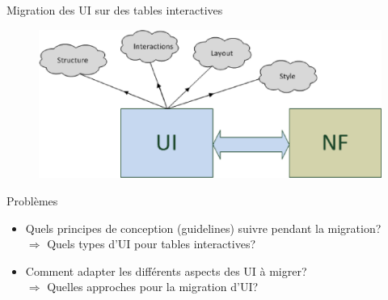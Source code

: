 \documentclass[11pt]{beamer}
\begin{document}
\begin{frame}{Migration des UI sur des tables interactives }
\begin{figure}[t]
\centering
\includegraphics[scale=.3]{./img/aspectui}
\end{figure}
\begin{block}{Problèmes}
	\begin{itemize}
		\item {\small Quels principes de conception (guidelines) suivre pendant la migration?}\\
				{\tiny $\Rightarrow$ Quels types d'UI pour tables interactives? }
		\item {\small Comment adapter les différents aspects des UI à migrer?}\\
            {\tiny $\Rightarrow$ Quelles approches pour la migration d'UI?}

	\end{itemize}
\end{block}

\end{frame}
\end{document}
